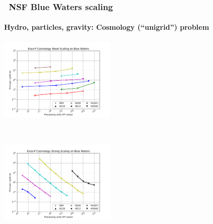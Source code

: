 \begin{frame}[fragile]
  \frametitle{\enzopcello\ NSF Blue Waters scaling}
  \framesubtitle{Hydro, particles, gravity: Cosmology (``unigrid'') problem}
  \begin{center}
    \vspace{-0.1in}
    \begin{minipage}{4.5in}
      \begin{center}
        \begin{minipage}{2.in}
          \includegraphics[width=2.2in]{Images/Scaling/smp-cosmo-weak.pdf}
        \end{minipage} \ 
        \begin{minipage}{2.2in}
          \includegraphics[width=2.2in]{Images/Scaling/smp-cosmo-strong.pdf}
        \end{minipage} \\
      \end{center}
    \end{minipage}
  \end{center}
\end{frame}
